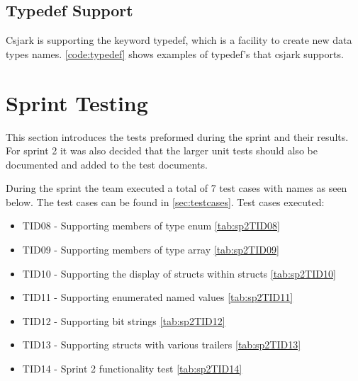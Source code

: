

\subsection{Typedef Support}
Csjark is supporting the keyword typedef, which is a facility to create new 
data types names. \autoref{code:typedef} shows examples of typedef's that 
csjark supports.



\section{Sprint Testing}
\label{sec:sp2:test}
This section introduces the tests preformed during the sprint and their results. For sprint 2 it was also decided that the larger unit tests should also be documented and added to the test documents.

During the sprint the team executed a total of 7 test cases with names as seen below. The test cases can be found in \autoref{sec:testcases}. Test cases executed:
\begin{itemize}
	\item TID08 - Supporting \glspl{member} of type \gls{enum} \autoref{tab:sp2TID08}
	\item TID09 - Supporting \glspl{member} of type \gls{array}  \autoref{tab:sp2TID09}
	\item TID10 - Supporting the display of \glspl{struct} within \glspl{struct}  \autoref{tab:sp2TID10}
	\item TID11 - Supporting \glspl{enumerated named value}  \autoref{tab:sp2TID11}
	\item TID12 - Supporting \glspl{bit string}  \autoref{tab:sp2TID12}
	\item TID13 - Supporting \glspl{struct} with various \gls{trailers} \autoref{tab:sp2TID13}
	\item TID14 - Sprint 2 functionality test \autoref{tab:sp2TID14}
\end{itemize}

